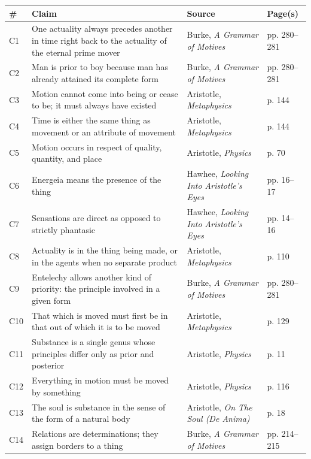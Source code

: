 \begin{center}
\footnotesize
\begin{tabular}{|l|l|l|l|}
\hline
\textbf{\#} & \textbf{Claim} & \textbf{Source} & \textbf{Page(s)} \\
\hline
C1 & One actuality always precedes another in time right back to the actuality of the eternal prime mover & Burke, \textit{A Grammar of Motives} & pp. 280--281 \\
\hline
C2 & Man is prior to boy because man has already attained its complete form & Burke, \textit{A Grammar of Motives} & pp. 280--281 \\
\hline
C3 & Motion cannot come into being or cease to be; it must always have existed & Aristotle, \textit{Metaphysics} & p. 144 \\
\hline
C4 & Time is either the same thing as movement or an attribute of movement & Aristotle, \textit{Metaphysics} & p. 144 \\
\hline
C5 & Motion occurs in respect of quality, quantity, and place & Aristotle, \textit{Physics} & p. 70 \\
\hline
C6 & Energeia means the presence of the thing & Hawhee, \textit{Looking Into Aristotle's Eyes} & pp. 16--17 \\
\hline
C7 & Sensations are direct as opposed to strictly phantasic & Hawhee, \textit{Looking Into Aristotle's Eyes} & pp. 14--16 \\
\hline
C8 & Actuality is in the thing being made, or in the agents when no separate product & Aristotle, \textit{Metaphysics} & p. 110 \\
\hline
C9 & Entelechy allows another kind of priority: the principle involved in a given form & Burke, \textit{A Grammar of Motives} & pp. 280--281 \\
\hline
C10 & That which is moved must first be in that out of which it is to be moved & Aristotle, \textit{Metaphysics} & p. 129 \\
\hline
C11 & Substance is a single genus whose principles differ only as prior and posterior & Aristotle, \textit{Physics} & p. 11 \\
\hline
C12 & Everything in motion must be moved by something & Aristotle, \textit{Physics} & p. 116 \\
\hline
C13 & The soul is substance in the sense of the form of a natural body & Aristotle, \textit{On The Soul (De Anima)} & p. 18 \\
\hline
C14 & Relations are determinations; they assign borders to a thing & Burke, \textit{A Grammar of Motives} & pp. 214--215 \\

\end{tabular}
\end{center}
